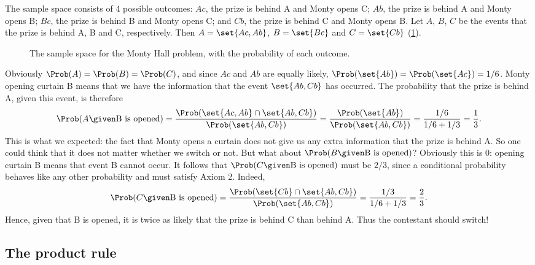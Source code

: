\begin{solution}
The sample space consists of 4 possible outcomes: $Ac$, the prize is behind A and Monty opens C; $Ab$, the prize is behind A and Monty opens B; $Bc$, the prize is behind B and Monty opens C; and $Cb$, the prize is behind C and Monty opens B. Let $A$, $B$, $C$ be the events that the prize is behind A, B and C, respectively. Then $A = \set{Ac, Ab}$, $B = \set{Bc}$ and $C = \set{Cb}$ (\cref{fig:monty-hall}).

\begin{figure}[ht]
\centering
{}
\caption{The sample space for the Monty Hall problem, with the probability of each outcome.}
\label{fig:monty-hall}
\end{figure}

Obviously $\Prob(A) = \Prob(B) = \Prob(C)$, and since $Ac$ and $Ab$ are equally likely, $\Prob(\set{Ab}) = \Prob(\set{Ac}) = 1/6$. Monty opening curtain B means that we have the information that the event $\set{Ab, Cb}$ has occurred. The probability that the prize is behind A, given this event, is therefore
\[
  \Prob(A \given \text{B is opened}) = \frac{\Prob(\set{Ac, Ab} \cap \set{Ab, Cb})}{\Prob(\set{Ab, Cb})} = \frac{\Prob(\set{Ab})}{\Prob(\set{Ab, Cb})} = \frac{1/6}{1/6 + 1/3} = \frac13.
\]
This is what we expected: the fact that Monty opens a curtain does not give us any extra information that the prize is behind A. So one could think that it does not matter whether we switch or not. But what about $\Prob(B \given \text{B is opened})$? Obviously this is 0: opening curtain B means that event B cannot occur. It follows that $\Prob(C \given \text{B is opened})$ must be $2/3$, since a conditional probability behaves like any other probability and must satisfy Axiom 2. Indeed,
\[
  \Prob(C \given \text{B is opened}) = \frac{\Prob(\set{Cb} \cap \set{Ab, Cb})}{\Prob(\set{Ab, Cb})} = \frac{1/3}{1/6 + 1/3} = \frac23.
\]
Hence, given that B is opened, it is twice as likely that the prize is behind C than behind A. Thus the contestant should switch!
\end{solution}

\subsection{The product rule}\label{sec:product-rule}

